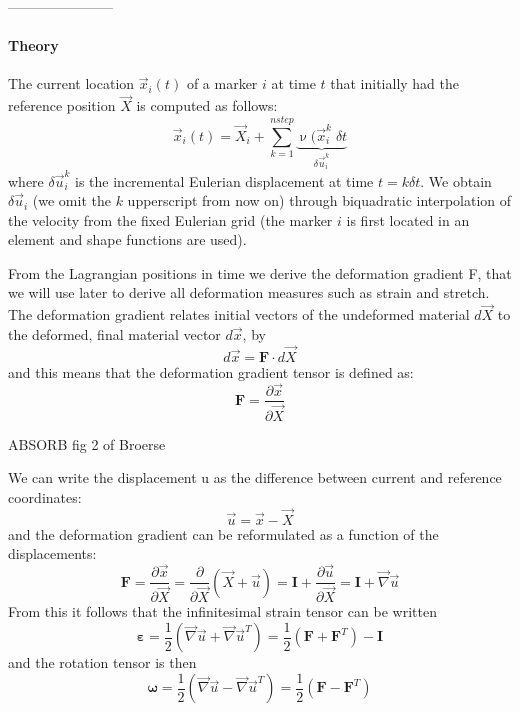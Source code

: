 -----------------------

\paragraph{Theory}


The current location $\vec{x}_i(t)$ of a marker $i$ at time $t$ that initially had the reference
position $\vec{X}$ is computed as follows:
\[
\vec{x}_i(t)= \vec{X}_i + \sum_{k=1}^{nstep}  \underbrace{\upnu(\vec{x}_i^k \; \delta t}_{\delta \vec{u}_i^k}
\]
where $\delta \vec{u}_i^k$ is the incremental Eulerian displacement at time $t=k\delta t$.
We obtain $\delta \vec{u}_i$ (we omit the $k$ upperscript from now on) through 
biquadratic interpolation of the velocity from the fixed Eulerian grid (the marker $i$
is first located in an element and shape functions are used).

From the Lagrangian positions in time we derive the deformation gradient F, that we will use
later to derive all deformation measures such as strain and stretch.
The deformation gradient relates initial vectors of the undeformed material
$d\vec{X}$ to the deformed, final material vector $d\vec{x}$, by
\[
d\vec{x} = {\bm F}\cdot d\vec{X}
\]
and this means that the deformation gradient tensor is defined as: 
\[
{\bm F} = \frac{\partial \vec{x}}{\partial \vec{X}}
\]

ABSORB fig 2 of Broerse

We can write the displacement u as the difference between current and reference coordinates:
\[
\vec{u} = \vec{x}-\vec{X}
\]
and the deformation gradient can be reformulated as a function of the displacements:
\[
{\bm F} 
= \frac{\partial \vec{x}}{\partial \vec{X}} 
= \frac{\partial }{\partial \vec{X}} (\vec{X}+\vec{u})
= {\bm I} + \frac{\partial \vec{u}}{\partial \vec{X}} 
= {\bm I} + \vec{\nabla}\vec{u} 
\]
From this it follows that the infinitesimal strain tensor can be written
\[
{\bm \varepsilon} = \frac{1}{2}( \vec\nabla\vec{u} + \vec\nabla\vec{u}^T )
= \frac{1}{2} (  {\bm F} +  {\bm F}^T) - {\bm I} 
\]
and the rotation tensor is then 
\[
{\bm \omega} 
=\frac{1}{2}( \vec\nabla\vec{u} - \vec\nabla\vec{u}^T )
= \frac{1}{2} (  {\bm F} -  {\bm F}^T)
\]


